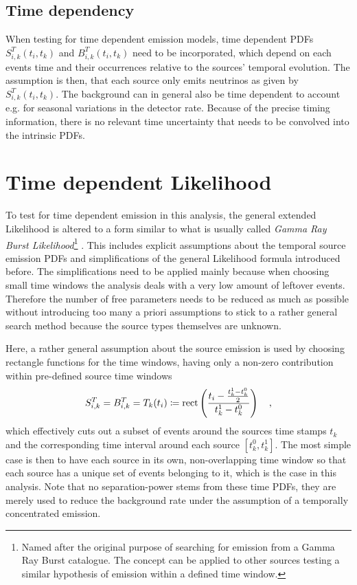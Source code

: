 \subsection{Time dependency}
When testing for time dependent emission models, time dependent PDFs $S_{i,k}^T(t_i, t_k)$ and $B_{i,k}^T(t_i, t_k)$ need to be incorporated, which depend on each events time and their occurrences relative to the sources' temporal evolution.
The assumption is then, that each source only emits neutrinos as given by $S_{i,k}^T(t_i, t_k)$.
The background can in general also be time dependent to account e.g. for seasonal variations in the detector rate.
Because of the precise timing information, there is no relevant time uncertainty that needs to be convolved into the intrinsic PDFs.


\section{Time dependent Likelihood}
To test for time dependent emission in this analysis, the general extended Likelihood is altered to a form similar to what is usually called \emph{Gamma Ray Burst Likelihood}\footnote{Named after the original purpose of searching for emission from a Gamma Ray Burst catalogue. The concept can be applied to other sources testing a similar hypothesis of emission within a defined time window.} .
This includes explicit assumptions about the temporal source emission PDFs and simplifications of the general Likelihood formula introduced before.
The simplifications need to be applied mainly because when choosing small time windows the analysis deals with a very low amount of leftover events.
Therefore the number of free parameters needs to be reduced as much as possible without introducing too many a priori assumptions to stick to a rather general search method because the source types themselves are unknown.

Here, a rather general assumption about the source emission is used by choosing rectangle functions  for the time windows, having only a non-zero contribution within pre-defined source time windows
\begin{equation}
  S_{i,k}^T = B_{i,k}^T = T_k(t_i) \coloneqq
    \operatorname{rect}\left(\frac{t_i - \frac{t_k^1-t_k^0}{2}}
                              {t_k^1-t_k^0}\right)
  \quad\text{,}
\end{equation}
which effectively cuts out a subset of events around the sources time stamps $t_k$ and the corresponding time interval around each source $[t_k^0, t_k^1]$.
The most simple case is then to have each source in its own, non-overlapping time window so that each source has a unique set of events belonging to it, which is the case in this analysis.
Note that no separation-power stems from these time PDFs, they are merely used to reduce the background rate under the assumption of a temporally concentrated emission.

